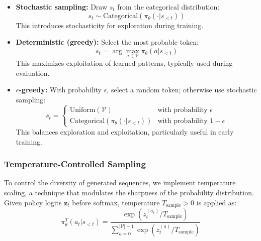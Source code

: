 \documentclass[conference]{IEEEtran}
\begin{document}
\begin{itemize}
    \item \textbf{Stochastic sampling:} Draw $s_t$ from the categorical distribution:
    \begin{equation}
    s_t \sim \text{Categorical}(\pi_\theta(\cdot | s_{<t}))
    \end{equation}
    This introduces stochasticity for exploration during training.
    
    \item \textbf{Deterministic (greedy):} Select the most probable token:
    \begin{equation}
    s_t = \arg\max_{a \in \mathcal{V}} \pi_\theta(a | s_{<t})
    \end{equation}
    This maximizes exploitation of learned patterns, typically used during evaluation.
    
    \item \textbf{$\epsilon$-greedy:} With probability $\epsilon$, select a random token; otherwise use stochastic sampling:
    \begin{equation}
    s_t = \begin{cases}
    \text{Uniform}(\mathcal{V}) & \text{with probability } \epsilon \\
    \text{Categorical}(\pi_\theta(\cdot | s_{<t})) & \text{with probability } 1 - \epsilon
    \end{cases}
    \end{equation}
    This balances exploration and exploitation, particularly useful in early training.
\end{itemize}

\subsubsection{Temperature-Controlled Sampling}

To control the diversity of generated sequences, we implement temperature scaling, a technique that modulates the sharpness of the probability distribution. Given policy logits $\mathbf{z}_t$ before softmax, temperature $T_{\text{sample}} > 0$ is applied as:
\begin{equation}
\pi_\theta^{T}(a_t | s_{<t}) = \frac{\exp(z_t^{(a_t)} / T_{\text{sample}})}{\sum_{a=0}^{|\mathcal{V}|-1} \exp(z_t^{(a)} / T_{\text{sample}})}
\end{equation}
\end{document}
